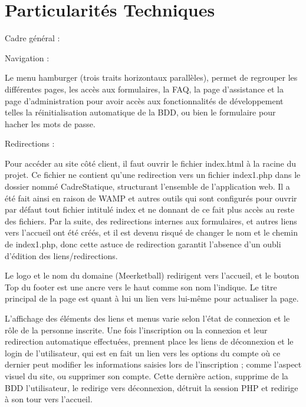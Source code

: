 \documentclass[12pt]{report}
\begin{document}
        \chapter{Particularités Techniques}
\bigskip
\par          
Cadre général :
\bigskip
\par  
Navigation :
\bigskip
\par        
Le menu hamburger (trois traits horizontaux parallèles), permet de regrouper les différentes
pages, les accès aux formulaires, la FAQ, la page d’assistance et la page d’administration pour avoir
accès aux fonctionnalités de développement telles la réinitialisation automatique de la BDD, ou bien
le formulaire pour hacher les mots de passe.
\bigskip
\par    
Redirections :
\bigskip
\par            
Pour accéder au site côté client, il faut ouvrir le fichier index.html à la racine du projet. Ce
fichier ne contient qu’une redirection vers un fichier index1.php dans le dossier nommé
CadreStatique, structurant l’ensemble de l’application web. Il a été fait ainsi en raison de WAMP et
autres outils qui sont configurés pour ouvrir par défaut tout fichier intitulé index et ne donnant de ce
fait plus accès au reste des fichiers. Par la suite, des redirections internes aux formulaires, et autres
liens vers l’accueil ont été créés, et il est devenu risqué de changer le nom et le chemin de
index1.php, donc cette astuce de redirection garantit l’absence d’un oubli d’édition des
liens/redirections.
\bigskip
\par    
Le logo et le nom du domaine (Meerketball) redirigent vers l’accueil, et le bouton Top du footer
est une ancre vers le haut comme son nom l’indique. Le titre principal de la page est quant à lui un
lien vers lui-même pour actualiser la page.
\bigskip
\par    
L’affichage des éléments des liens et menus varie selon l’état de connexion et le rôle de la
personne inscrite. Une fois l’inscription ou la connexion et leur redirection automatique effectuées,
prennent place les liens de déconnexion et le login de l’utilisateur, qui est en fait un lien vers les
options du compte où ce dernier peut modifier les informations saisies lors de l’inscription ; comme
l’aspect visuel du site, ou supprimer son compte. Cette dernière action, supprime de la BDD
l’utilisateur, le redirige vers déconnexion, détruit la session PHP et redirige à son tour vers l’accueil.
\bigskip
\par    
\end{document}
